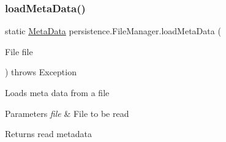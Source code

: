 \subsubsection{\texorpdfstring{load\+Meta\+Data()}{loadMetaData()}}
{\footnotesize\ttfamily static \mbox{\hyperlink{classpersistence_1_1_meta_data}{Meta\+Data}} persistence.\+File\+Manager.\+load\+Meta\+Data (\begin{DoxyParamCaption}\item[{File}]{file }\end{DoxyParamCaption}) throws Exception\hspace{0.3cm}{\ttfamily [static]}}

Loads meta data from a file 
\begin{DoxyParams}{Parameters}
{\em file} & File to be read \\
\hline
\end{DoxyParams}
\begin{DoxyReturn}{Returns}
read metadata 
\end{DoxyReturn}

